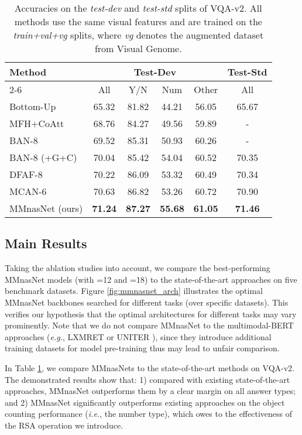 \documentclass[sigconf]{acmart}
\begin{document}
\setcounter{table}{2}
\begin{table}
\centering
\small
\caption{Accuracies on the \emph{test-dev} and \emph{test-std} splits of VQA-v2. All methods use the same visual features \cite{anderson2017up-down} and are trained on the \emph{train+val+vg} splits, where \emph{vg} denotes the augmented dataset from Visual Genome.}
\label{table:vqav2}
\begin{tabular}{l|cccc|c}
\toprule
\multirow{3}{*}{Method} & \multicolumn{4}{c|}{Test-Dev} &Test-Std \\
\cmidrule{2-6}
 & All & Y/N & Num & Other & All \\
\midrule
Bottom-Up \cite{teney2018tips} &65.32& 81.82& 44.21& 56.05 &65.67\\
MFH+CoAtt \cite{yu2018beyond}& 68.76 &84.27 &49.56 &59.89& -\\
BAN-8 \cite{kim2018bilinear}& 69.52 &85.31& 50.93& 60.26&-\\
BAN-8 (+G+C) \cite{kim2018bilinear} & 70.04& 85.42& {54.04}&60.52&70.35 \\
DFAF-8 \cite{gao2019dynamic} & 70.22& 86.09& 53.32 &60.49 & 70.34 \\
MCAN-6 \cite{yu2019mcan} & 70.63 & {86.82} & 53.26 & 60.72 & 70.90 \\
\midrule
MMnasNet (ours) & \textbf{71.24} & \textbf{87.27} &\textbf{55.68} &\textbf{61.05} & \textbf{71.46}\\
\bottomrule
\end{tabular}
\end{table}

\subsection{Main Results}
Taking the ablation studies into account, we compare the best-performing MMnasNet models (with =12 and =18) to the state-of-the-art approaches on five benchmark datasets. Figure \ref{fig:mmnasnet_arch} illustrates the optimal MMnasNet backbones searched for different tasks (over specific datasets). This verifies our hypothesis that the optimal architectures for different tasks may vary prominently. Note that we do not compare MMnasNet to the multimodal-BERT approaches (\emph{e.g.}, LXMRET \cite{tan2019lxmert} or UNITER \cite{chen2019uniter}), since they introduce additional training datasets for model pre-training thus may lead to unfair comparison.

In Table \ref{table:vqav2}, we compare MMnasNets to the state-of-the-art methods on VQA-v2. The demonstrated results show that: 1) compared with existing state-of-the-art approaches, MMnasNet outperforms them by a clear margin on all answer types; and 2) MMnasNet significantly outperforms existing approaches on the object counting performance (\emph{i.e.}, the number type), which owes to the effectiveness of the RSA operation we introduce.
\end{document}
